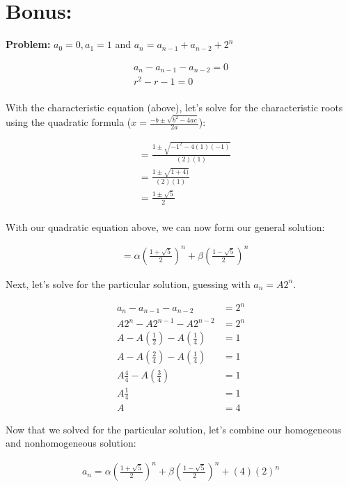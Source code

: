 \documentclass{article}
\begin{document}
\newpage

\section{Bonus:}

\textbf{Problem: } $a_0 = 0, a_1 = 1$ and $a_n = a_{n-1} + a_{n-2} +2^n$

\begin{align*}
    a_n - a_{n-1} - a_{n-2} = 0 \\
    r^2 - r - 1 = 0 \\
\end{align*}

With the characteristic equation (above), let's solve for the characteristic roots using the quadratic formula ($x = \frac{-b \pm \sqrt{b^2-4ac}}{2a}$):

\begin{align*}
    &= \frac{1 \pm \sqrt{-1^2-4(1)(-1)}}{(2)(1)} \\
    &= \frac{1 \pm \sqrt{1+4)}}{(2)(1)} \\
    &= \frac{1 \pm \sqrt{5}}{2} \\
\end{align*}

With our quadratic equation above, we can now form our general solution:

\begin{align*}
    &= \alpha(\frac{1 +  \sqrt{5}}{2})^n + \beta(\frac{1 - \sqrt{5}}{2})^n
\end{align*}

Next, let's solve for the particular solution, guessing with $a_n = A2^n$.

\begin{align*}
a_n - a_{n-1} - a_{n-2} &= 2^n \\
A2^n - A2^{n-1} - A2^{n-2} &= 2^n \\
A - A(\frac{1}{2}) - A(\frac{1}{4}) &= 1 \\
A - A(\frac{2}{4}) - A(\frac{1}{4}) &= 1 \\
A\frac{4}{4} - A(\frac{3}{4}) &= 1 \\
A\frac{1}{4} &= 1 \\
A &= 4
\end{align*}

Now that we solved for the particular solution, let's combine our homogeneous and nonhomogeneous solution:

\begin{align*}
   a_n =  \alpha(\frac{1 +  \sqrt{5}}{2})^n + \beta(\frac{1 - \sqrt{5}}{2})^n + (4)(2)^n
\end{align*}
\end{document}
